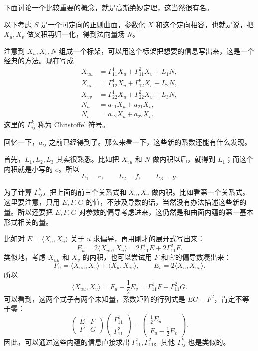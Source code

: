 \documentclass[UTF8,11pt,a4paper]{ctexart}
\newcommand{\ip}[2]{\langle #1,#2\rangle}
\begin{document}
下面讨论一个比较重要的概念，就是高斯绝妙定理，这当然很有名。

以下考虑 $S$ 是一个可定向的正则曲面，参数化 $X$ 和这个定向相容，也就是说，把 $X_u,X_v$ 做叉积再归一化，得到法向量场 $N$。

注意到 $X_u,X_v,N$ 组成一个标架，可以用这个标架把想要的信息写出来，这是一个经典的方法。现在写成
\[
\begin{aligned}
X_{uu}&=\Gamma^1_{11}X_u+\Gamma^2_{11}X_v+L_1N,\\
X_{uv}&=\Gamma^1_{12}X_u+\Gamma^2_{12}X_v+L_2N,\\
X_{vv}&=\Gamma^1_{22}X_u+\Gamma^2_{22}X_v+L_3N,\\
N_u&=a_{11}X_u+a_{21}X_v,\\
N_v&=a_{12}X_u+a_{22}X_v.
\end{aligned}
\]
这里的 $\Gamma^k_{ij}$ 称为 Christoffel 符号。

回忆一下，$a_{ij}$ 之前已经得到了。那么来看一下，这些新的系数还能有什么发现。

首先，$L_1,L_2,L_3$ 其实很熟悉。比如把 $X_{uu}$ 和 $N$ 做内积以后，就得到 $L_1$；而这个内积就是小写的 $e$。所以
\[
L_1=e,\qquad L_2=f,\qquad L_3=g.
\]

为了计算 $\Gamma^k_{ij}$，把上面的前三个关系式和 $X_u,X_v$ 做内积。比如看第一个关系式。这里要注意，只用 $E,F,G$ 的值，不涉及导数的话，当然没有办法描述这些新的量。所以还要把 $E,F,G$ 对参数的偏导考虑进来，这仍然是和曲面内蕴的第一基本形式相关的量。

比如对 $E=\ip{X_u}{X_u}$ 关于 $u$ 求偏导，再用刚才的展开式写出来：
\[
E_u=2\ip{X_{uu}}{X_u}
=2\Gamma^1_{11}E+2\Gamma^2_{11}F.
\]
类似地，考虑 $X_{uu}$ 和 $X_v$ 的内积，也可以尝试用 $F$ 和它的偏导数凑出来：
\[
F_u=\ip{X_{uu}}{X_v}+\ip{X_u}{X_{uv}},\qquad
E_v=2\ip{X_u}{X_{uv}}.
\]
所以
\[
\ip{X_{uu}}{X_v}=F_u-\frac12E_v
=\Gamma^1_{11}F+\Gamma^2_{11}G.
\]
可以看到，这两个式子有两个未知量，系数矩阵的行列式是 $EG-F^2$，肯定不等于零：
\[
\begin{pmatrix}E&F\\F&G\end{pmatrix}
\begin{pmatrix}\Gamma^1_{11}\\\Gamma^2_{11}\end{pmatrix}
=\begin{pmatrix}\frac12E_u\\F_u-\frac12E_v\end{pmatrix}.
\]
因此，可以通过这些内蕴的信息直接求出 $\Gamma^1_{11},\Gamma^2_{11}$。其他 $\Gamma^k_{ij}$ 也是类似的。
\end{document}
